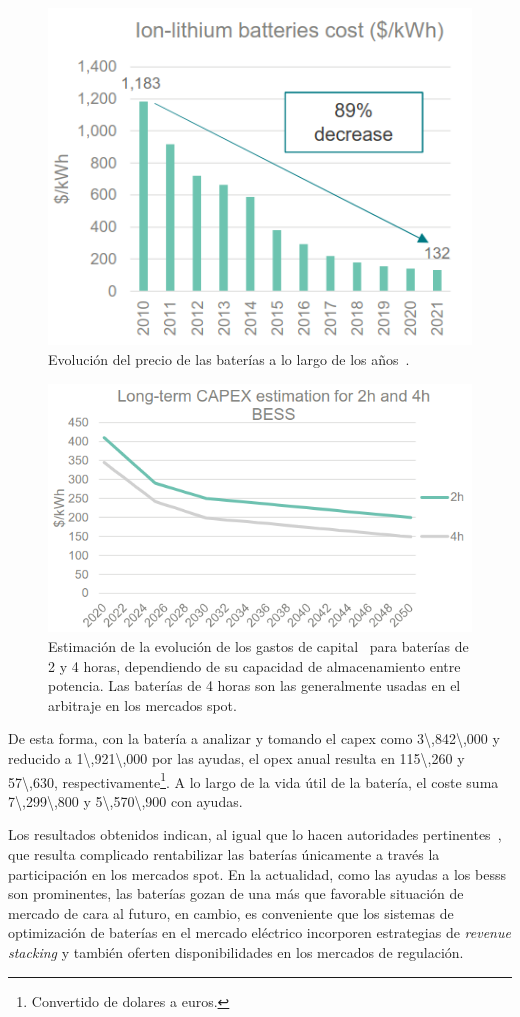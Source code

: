 \begin{figure}
  \centering
  \includegraphics[width=0.5\linewidth]{figures/precio-bateria.png}
  \caption[Evolución del precio de las baterías a lo largo de los años.]{Evolución del precio de las baterías a lo largo de los años~\cite{bnef2025strategic}.}
  \label{fig:precio-bateria}
\end{figure}

\begin{figure}
  \centering
  \includegraphics[width=0.5\linewidth]{figures/capex-bateria.png}
  \caption[Estimación de la evolución de los gastos de capital.]{Estimación de la evolución de los gastos de capital~\cite{national2025nrel} para baterías de 2 y 4 horas, dependiendo de su capacidad de almacenamiento entre potencia. Las baterías de 4 horas son las generalmente usadas en el arbitraje en los mercados spot.}
  \label{fig:capex-bateria}
\end{figure}

De esta forma, con la batería a analizar y tomando el \gls{capex} como \SI{3\,842\,000}{\text{\euro}} y reducido a \SI{1\,921\,000}{\text{\euro}} por las ayudas, el \gls{opex} anual resulta en \SI{115\,260}{\text{\euro}} y \SI{57\,630}{\text{\euro}}, respectivamente\footnote{Convertido de dolares a euros.}. A lo largo de la vida útil de la batería, el coste suma \SI{7\,299\,800}{\text{\euro}} y \SI{5\,570\,900}{\text{\euro}} con ayudas.

Los resultados obtenidos indican, al igual que lo hacen autoridades pertinentes~\cite{gadvisory2025technical}, que resulta complicado rentabilizar las baterías únicamente a través la participación en los mercados spot. En la actualidad, como las ayudas a los \glspl{bess} son prominentes, las baterías gozan de una más que favorable situación de mercado de cara al futuro, en cambio, es conveniente que los sistemas de optimización de baterías en el mercado eléctrico incorporen estrategias de \textit{revenue stacking} y también oferten disponibilidades en los mercados de regulación.

